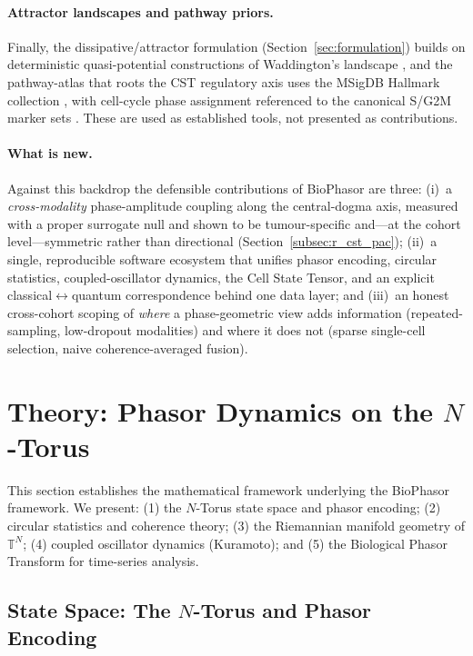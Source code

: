 \documentclass[preprint,12pt,amsmath,amssymb,superscriptaddress,floatfix]{revtex4-2}
\newcommand{\torus}{\mathbb{T}}
\begin{document}
\paragraph{Attractor landscapes and pathway priors.}
Finally, the dissipative/attractor formulation (Section~\ref{sec:formulation})
builds on deterministic quasi-potential constructions of Waddington's landscape
\citep{bhattacharya2011}, and the pathway-atlas that roots the CST regulatory
axis uses the MSigDB Hallmark collection \citep{liberzon2015}, with cell-cycle
phase assignment referenced to the canonical S/G2M marker sets \citep{tirosh2016}.
These are used as established tools, not presented as contributions.

\paragraph{What is new.}
Against this backdrop the defensible contributions of BioPhasor are three:
(i)~a \emph{cross-modality} phase-amplitude coupling along the central-dogma
axis, measured with a proper surrogate null and shown to be tumour-specific
and---at the cohort level---symmetric rather than directional
(Section~\ref{subsec:r_cst_pac}); (ii)~a single, reproducible
software ecosystem that unifies phasor encoding, circular statistics,
coupled-oscillator dynamics, the Cell State Tensor, and an explicit
classical$\leftrightarrow$quantum correspondence behind one data layer; and
(iii)~an honest cross-cohort scoping of \emph{where} a phase-geometric view adds
information (repeated-sampling, low-dropout modalities) and where it does not
(sparse single-cell selection, naive coherence-averaged fusion).


\section{Theory: Phasor Dynamics on the $N$-Torus}
\label{sec:theory}

This section establishes the mathematical framework underlying the
BioPhasor framework.
We present: (1) the $N$-Torus state space and phasor encoding;
(2) circular statistics and coherence theory;
(3) the Riemannian manifold geometry of $\torus^N$;
(4) coupled oscillator dynamics (Kuramoto); and
(5) the Biological Phasor Transform for time-series analysis.

\subsection{State Space: The $N$-Torus and Phasor Encoding}
\label{subsec:state_space}
\end{document}
